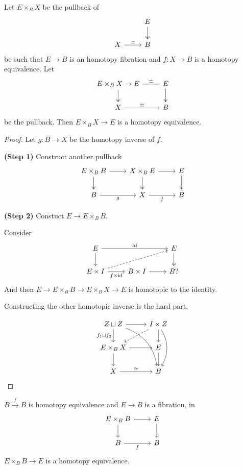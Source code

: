 \documentclass{article}
\numberwithin{equation}{section}
\DeclareMathOperator{\id}{id}
\begin{document}
\begin{lemma}
	Let $E\times_BX$ be the pullback of
	\[\begin{tikzcd}
		&E\arrow[d,two heads]\\
		X\arrow[r,"\simeq"]&B
	\end{tikzcd}\]
	be such that $E\to B$ is an homotopy fibration and $f:X\to B$ is a homotopy equivalence. Let
	\[\begin{tikzcd}
		E\times_BX\to E\arrow[r,dash,"\simeq"]\arrow[d,two heads]&E\arrow[d,two heads]\\
		X\arrow[r,"\simeq"]&B
	\end{tikzcd}\]
	be the pullback. Then $E\times_BX\to E$ is a homotopy equivalence.
\end{lemma}
\begin{proof}
	Let $g:B\to X$ be the homotopy inverse of $f$.
	
	\textbf{(Step 1)} Construct another pullback
	\[\begin{tikzcd}
		E\times_BB\arrow[r]\arrow[d,two heads]&X\times_BE\arrow[r]\arrow[d,two heads]&E\arrow[d,two heads]\\
		B\arrow[r,"g",swap]&X\arrow[r,"f",swap]&B
	\end{tikzcd}\]
	
	\textbf{(Step 2)} Constuct $E\to E\times_BB$.
	
	Consider
	\[\begin{tikzcd}
		E\arrow[rr,"\id"]\arrow[d]&&E\arrow[d,two heads]\\
		E\times I\arrow[r,"f\times \id",swap]\arrow[rru,dashed]&B\times I\arrow[r]&B?
	\end{tikzcd}\]
	And then $E\to E\times_BB\to E\times_BX\to E$ is homotopic to the identity.
	
	Constructing the other homotopic inverse is the hard part.
	
	\[\begin{tikzcd}
		Z\sqcup Z\arrow[d,swap,"f_1\sqcup f_2"]\arrow[r]\arrow[rdd,bend left]&I\times Z\arrow[ld,dashed]\arrow[d]\arrow[dd,bend left]\\
		E\times_BX\arrow[r]\arrow[d]&E\arrow[d]\\
		X\arrow[r,"\simeq"]&B
	\end{tikzcd}\]
\end{proof}
\begin{coro}
	$B\overset{f}{\to}B$ is homotopy equivalence and $E\to B$ is a fibration, in
	\[\begin{tikzcd}
		E\times_BB\arrow[d]\arrow[r]&E\arrow[d]\\
		B\arrow[r,"f",swap]&B
	\end{tikzcd}\]
	$E\times_BB\to E$ is a homotopy equivalence.
\end{coro}
\end{document}
